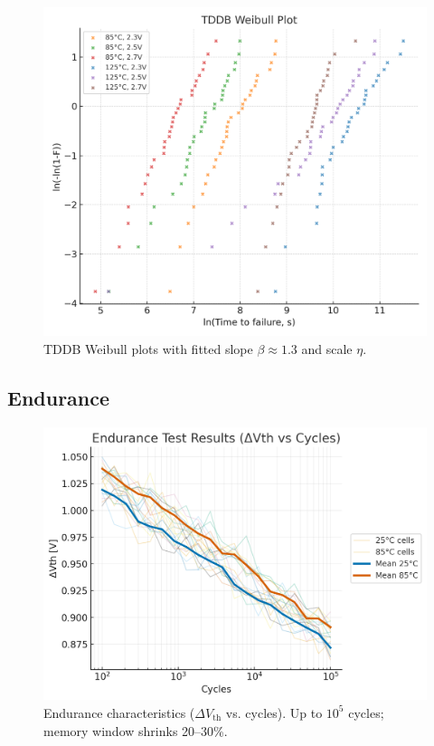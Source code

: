 \documentclass[conference]{IEEEtran}
\newcommand{\figw}{0.90\linewidth}
\begin{document}
\begin{figure}[!htb]
  \centering
  \includegraphics[width=\figw]{figures/fig4_tddb_weibull.png}
  \caption{TDDB Weibull plots with fitted slope $\beta \approx 1.3$ and scale $\eta$.}
  \label{fig:tddb_weibull}
\end{figure}

\subsection{Endurance}
\begin{figure}[!htb]
  \centering
  \includegraphics[width=\figw]{figures/fig5_endurance.png}
  \caption{Endurance characteristics ($\Delta V_{\mathrm{th}}$ vs. cycles). Up to $10^5$ cycles; memory window shrinks 20--30\%.}
  \label{fig:endurance}
\end{figure}
\end{document}
